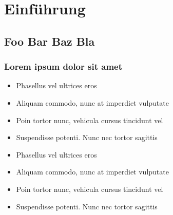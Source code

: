 \section{Einführung}

\subsection{Foo Bar Baz Bla}

\frame
{
  \frametitle{Lorem ipsum dolor sit amet}
  \begin{itemize}
    \item{Phasellus vel ultrices eros}
    \item{Aliquam commodo, nunc at imperdiet vulputate}
    \item{Poin tortor nunc, vehicula cursus tincidunt vel}
    \item{Suspendisse potenti. Nunc nec tortor sagittis}
    \item{Phasellus vel ultrices eros}
    \item{Aliquam commodo, nunc at imperdiet vulputate}
    \item{Poin tortor nunc, vehicula cursus tincidunt vel}
    \item{Suspendisse potenti. Nunc nec tortor sagittis}
  \end{itemize}
}



